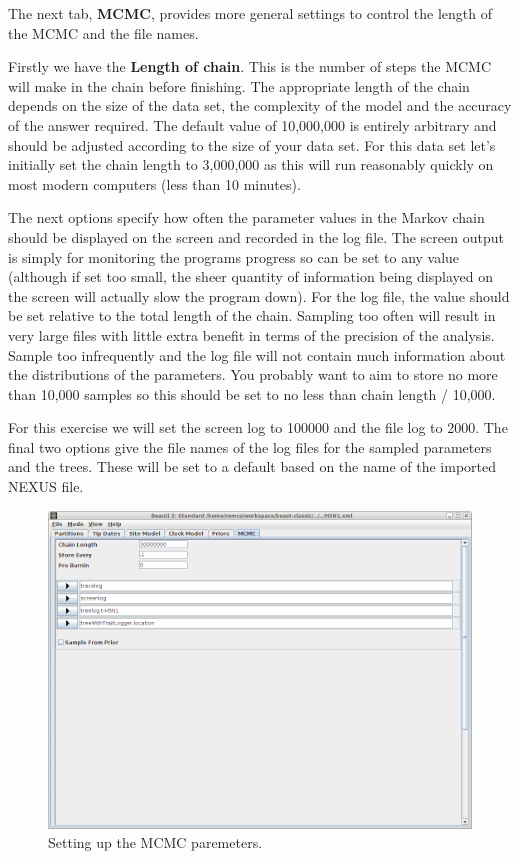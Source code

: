 \documentclass{article}
\begin{document}
The next tab, {\bf MCMC}, provides more general
settings to control the length of the MCMC and the file names. 

Firstly we have the \textbf{Length of chain}. This is the number of
steps the MCMC will make in the chain before finishing. The appropriate length of the chain depends on the size of the data set, the complexity of the
model and the accuracy of the answer required. The default value of 10,000,000
is entirely arbitrary and should be adjusted according to the size
of your data set. For this data set let's initially set the chain
length to 3,000,000 as this will run reasonably quickly on most modern
computers (less than 10 minutes).

The next options specify how often the parameter values in the Markov
chain should be displayed on the screen and recorded in the log file.
The screen output is simply for monitoring the programs progress so
can be set to any value (although if set too small, the sheer quantity
of information being displayed on the screen will actually slow the
program down). For the log file, the value should be set relative
to the total length of the chain. Sampling too often will result in
very large files with little extra benefit in terms of the precision
of the analysis. Sample too infrequently and the log file will not
contain much information about the distributions of the parameters. 
You probably want to aim to store no more than 10,000 samples so this should be
set to no less than chain length / 10,000.

For this exercise we will set the screen log to 100000 and the file log to 2000. The final two
options give the file names of the log files for the sampled parameters and
the trees. These will be set to a default based on the name of the
imported NEXUS file. 

\begin{figure}
\begin{center}

\includegraphics[scale=0.4]{figures/BEAUti_MCMC}

\end{center}
\caption{\label{fig.MCMC} Setting up the MCMC paremeters.}
\end{figure}
\end{document}

